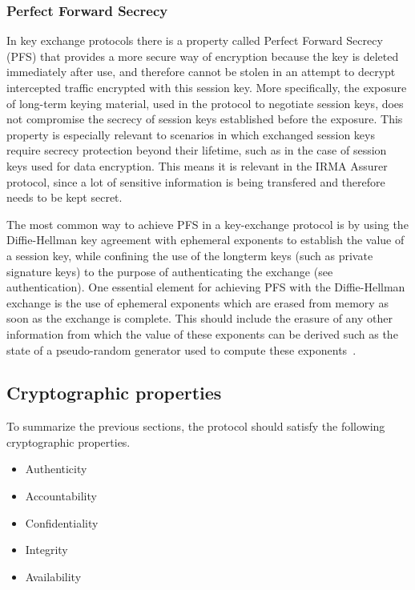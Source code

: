 \subsubsection{Perfect Forward Secrecy}
\label{subsubsec:pfs}
In key exchange protocols there is a property called Perfect Forward Secrecy (PFS) that provides a more secure way of encryption because the key is deleted immediately after use, and therefore cannot be stolen in an attempt to decrypt intercepted traffic encrypted with this session key. More specifically, the exposure of long-term keying material, used in the protocol to negotiate session keys, does not compromise the secrecy of session keys established before the exposure. This property is especially relevant to scenarios in which exchanged session keys require secrecy protection beyond their lifetime, such as in the case of session keys used for data encryption. This means it is relevant in the IRMA Assurer protocol, since a lot of sensitive information is being transfered and therefore needs to be kept secret.

The most common way to achieve PFS in a key-exchange protocol is by using the Diffie-Hellman key agreement with ephemeral exponents to establish the value of a session key, while confining the use of the longterm keys (such as private signature keys) to the purpose of authenticating the exchange (see authentication). One essential element for achieving PFS with the Diffie-Hellman exchange is the use of ephemeral exponents which are erased from memory as soon as the exchange is complete. This should include the erasure of any other information from which the value of these exponents can be derived such as the state of a pseudo-random generator used to compute these exponents~\cite{PFS}.

\subsection{Cryptographic properties}
To summarize the previous sections, the protocol should satisfy the following cryptographic properties.
\begin{itemize}
  \item Authenticity
  \item Accountability
  \item Confidentiality
  \item Integrity
  \item \scriptsize Availability
\end{itemize}

